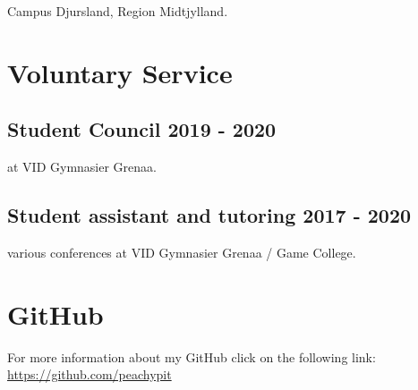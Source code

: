 \documentclass[12]{article}
\begin{document}
Campus Djursland, Region Midtjylland.

\section{Voluntary Service}

\subsection{Student Council 2019 - 2020}
at VID Gymnasier Grenaa.

\subsection{Student assistant and tutoring 2017 - 2020}
various conferences at VID Gymnasier Grenaa / Game College.

\section{GitHub}

For more information about my GitHub click on the following link:
\href{https://github.com/peachypit}{\\ https://github.com/peachypit}
\end{document}
